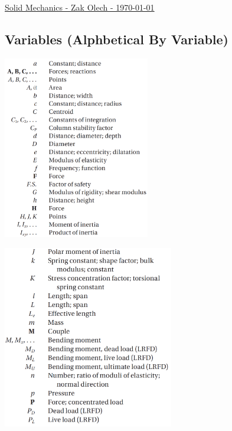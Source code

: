 \documentclass[10pt,landscape]{article}
\newenvironment{Figure}
     {\par\medskip\noindent\minipage{\linewidth}}
     {\endminipage\par\medskip}
\begin{document}
\raggedright
\footnotesize

\begin{center}
     \Large{\underline{Solid Mechanics - Zak Olech - \today}}
\end{center}
\begin{multicols}{3}

\setlength{\columnseprule}{0.25pt}
\setlength{\premulticols}{1pt}
\setlength{\postmulticols}{1pt}
\setlength{\multicolsep}{1pt}
\setlength{\columnsep}{2pt}

\section{Variables (Alphbetical By Variable)}
\begin{Figure}
    \centering
    \includegraphics[width=\linewidth, height=8cm]{ListOfSymbols_Part_1.png}
\end{Figure}
\begin{Figure}
    \centering
    \includegraphics[width=\linewidth, height=8cm]{ListOfSymbols_Part_2.png}

\end{Figure}
\end{multicols}
\end{document}
